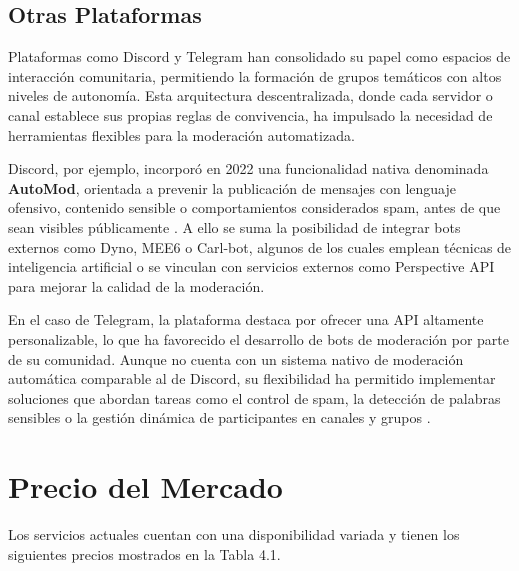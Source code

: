 \subsection{Otras Plataformas}

Plataformas como Discord y Telegram han consolidado su papel como espacios de interacción comunitaria, permitiendo la formación de grupos temáticos con altos niveles de autonomía. Esta arquitectura descentralizada, donde cada servidor o canal establece sus propias reglas de convivencia, ha impulsado la necesidad de herramientas flexibles para la moderación automatizada.

Discord, por ejemplo, incorporó en 2022 una funcionalidad nativa denominada \textbf{AutoMod}, orientada a prevenir la publicación de mensajes con lenguaje ofensivo, contenido sensible o comportamientos considerados spam, antes de que sean visibles públicamente \cite{discord2025automod}. A ello se suma la posibilidad de integrar bots externos como Dyno, MEE6 o Carl-bot, algunos de los cuales emplean técnicas de inteligencia artificial o se vinculan con servicios externos como Perspective API para mejorar la calidad de la moderación.

En el caso de Telegram, la plataforma destaca por ofrecer una API altamente personalizable, lo que ha favorecido el desarrollo de bots de moderación por parte de su comunidad. Aunque no cuenta con un sistema nativo de moderación automática comparable al de Discord, su flexibilidad ha permitido implementar soluciones que abordan tareas como el control de spam, la detección de palabras sensibles o la gestión dinámica de participantes en canales y grupos \cite{telegram2025bots}.

\section{Precio del Mercado}

Los servicios actuales cuentan con una disponibilidad variada y tienen los siguientes precios mostrados en la Tabla 4.1.



\vspace{0.5cm}

